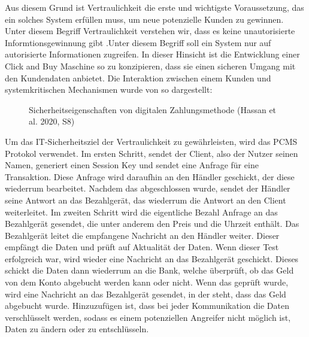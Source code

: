 Aus diesem Grund ist Vertraulichkeit die erste und wichtigste Voraussetzung, das ein solches System 
erfüllen muss, um neue potenzielle Kunden zu gewinnen. Unter diesem Begriff Vertraulichkeit verstehen wir, 
dass es keine unautorisierte Informtionsgewinnung gibt \cite{refbook:SWIS} .Unter diesem Begriff soll
ein System nur auf autorisierte Informationen zugreifen. In dieser Hinsicht ist die Entwicklung 
einer Click and Buy Maschine so zu konzipieren, dass sie einen sicheren Umgang mit den Kundendaten
anbietet. Die Interaktion zwischen einem Kunden und systemkritischen Mechanismen wurde von
\cite{refart:HARE} so dargestellt:

\vfill
\begin{figure}[htb]
    \caption{Sicherheitseigenschaften von digitalen Zahlungsmethode (Hassan et al. 2020, S8)}
    \label{fig:refark_HARE}
\end{figure}
\vfill


Um das IT-Sicherheitsziel der Vertraulichkeit zu gewährleisten, wird das PCMS Protokol verwendet. 
Im ersten Schritt, sendet der Client, also der Nutzer seinen Namen, generiert einen Session Key 
und sendet eine Anfrage für eine Transaktion. Diese Anfrage wird daraufhin an den Händler geschickt,
der diese wiederrum bearbeitet. Nachdem das abgeschlossen wurde, sendet der Händler seine Antwort
an das Bezahlgerät, das wiederrum die Antwort an den Client weiterleitet. Im zweiten Schritt wird
die eigentliche Bezahl Anfrage an das Bezahlgerät gesendet, die unter anderem den Preis und die 
Uhrzeit enthält. Das Bezahlgerät leitet die empfangene Nachricht an den Händler weiter. 
Dieser empfängt die Daten und prüft auf Aktualität der Daten. Wenn dieser Test erfolgreich war, 
wird wieder eine Nachricht an das Bezahlgerät geschickt. Dieses schickt die Daten dann wiederrum 
an die Bank, welche überprüft, ob das Geld von dem Konto abgebucht werden kann oder nicht.
Wenn das geprüft wurde, wird eine Nachricht an das Bezahlgerät gesendet, in der steht, dass das
Geld abgebucht wurde. Hinzuzufügen ist, dass bei jeder Kommunikation die Daten verschlüsselt werden, 
sodass es einem potenziellen Angreifer nicht möglich ist, Daten zu ändern oder zu entschlüsseln.

